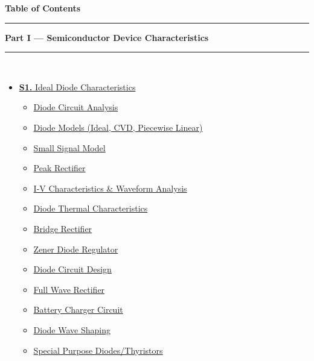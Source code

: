\documentclass[12pt,a3paper]{article}
\begin{document}
\thispagestyle{fancy}
\begin{center}
  {\LARGE\bfseries\textcolor{pblue}{Table of Contents}}\\[6pt]
  \textcolor{pblue}{\rule{0.6\textwidth}{0.8pt}}
\end{center}
\vspace{6pt}

\begin{tcolorbox}[breakable,colback=cA!5,colframe=cA,boxrule=1pt,arc=5pt,
  left=8pt,right=8pt,top=8pt,bottom=8pt,before skip=4pt]
  {\large\bfseries\textcolor{cA}{Part I --- Semiconductor Device Characteristics}}\\[5pt]
  \textcolor{cA!40}{\rule{\textwidth}{0.4pt}}\\[3pt]
  \small\begin{itemize}[leftmargin=1.2em,itemsep=1pt,label={\textcolor{cA}{$\triangleright$}}]
    \item \hyperref[sec:S1]{\textbf{S1.} Ideal Diode Characteristics}
      \begin{itemize}[leftmargin=1.5em,itemsep=0pt,label={\textcolor{cA}{$\cdot$}}]
        \item \hyperref[sub:s1-dc]{Diode Circuit Analysis}
        \item \hyperref[sub:s1-models]{Diode Models (Ideal, CVD, Piecewise Linear)}
        \item \hyperref[sub:s1-ssm]{Small Signal Model}
        \item \hyperref[sub:s1-peak]{Peak Rectifier}
        \item \hyperref[sub:s1-iv]{I-V Characteristics \& Waveform Analysis}
        \item \hyperref[sub:s1-thermal]{Diode Thermal Characteristics}
        \item \hyperref[sub:s1-rectifier]{Bridge Rectifier}
        \item \hyperref[sub:s1-zener]{Zener Diode Regulator}
        \item \hyperref[sub:s1-design]{Diode Circuit Design}
        \item \hyperref[sub:s1-fwr]{Full Wave Rectifier}
        \item \hyperref[sub:s1-battery]{Battery Charger Circuit}
        \item \hyperref[sub:s1-waveshape]{Diode Wave Shaping}
        \item \hyperref[sub:s1-spd]{Special Purpose Diodes/Thyristors}
      \end{itemize}


\end{itemize}
\end{tcolorbox}
\end{document}
